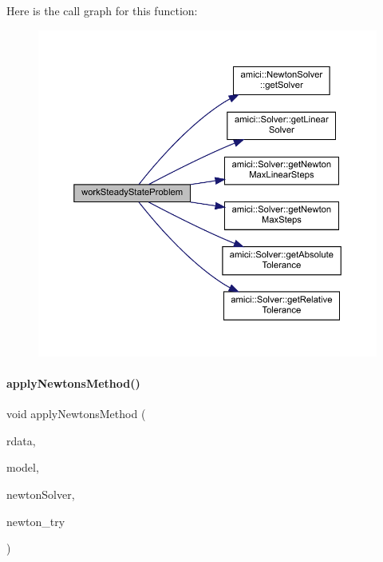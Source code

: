 Here is the call graph for this function\+:
\nopagebreak
\begin{figure}[H]
\begin{center}
\leavevmode
\includegraphics[width=350pt]{classamici_1_1_steadystate_problem_aa2630b3401b8f0a50bf50c73d4f39790_cgraph}
\end{center}
\end{figure}
\mbox{\label{classamici_1_1_steadystate_problem_a1c33ff72fd843a1a51cd93448e3e5a77}} 
\paragraph{\texorpdfstring{apply\+Newtons\+Method()}{applyNewtonsMethod()}}
{\footnotesize\ttfamily void apply\+Newtons\+Method (\begin{DoxyParamCaption}\item[{\mbox{\hyperlink{classamici_1_1_return_data}{Return\+Data}} $\ast$}]{rdata,  }\item[{\mbox{\hyperlink{classamici_1_1_model}{Model}} $\ast$}]{model,  }\item[{\mbox{\hyperlink{classamici_1_1_newton_solver}{Newton\+Solver}} $\ast$}]{newton\+Solver,  }\item[{int}]{newton\+\_\+try }\end{DoxyParamCaption})}

